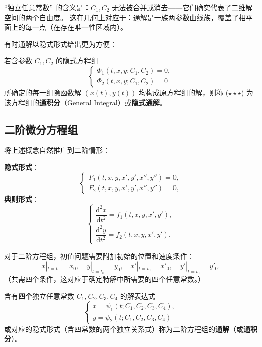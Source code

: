 \documentclass[lang=cn,11pt]{elegantbook}
\begin{document}
\begin{remark}[通解的独立性]
``独立任意常数'' 的含义是：$C_1,C_2$ 无法被合并或消去——它们确实代表了二维解空间的两个自由度。
这在几何上对应于：通解是一族两参数曲线族，覆盖了相平面上的每一点（在存在唯一性区域内）。
\end{remark}

有时通解以隐式形式给出更为方便：

\begin{definition}[一阶方程组的通积分] \label{def:first-integral-sys}
若含参数 $C_1,C_2$ 的隐式方程组
\[
\begin{cases}
\Phi_1(t,x,y;C_1,C_2)=0,\\
\Phi_2(t,x,y;C_1,C_2)=0
\end{cases}
\tag{$\star\star\star$}
\]
所确定的每一组隐函数解 $(x(t),y(t))$ 均构成原方程组的解，则称 ($\star\star\star$) 为该方程组的\textbf{通积分}（General Integral）或\textbf{隐式通解}。
\end{definition}


\subsection{二阶微分方程组}

将上述概念自然推广到二阶情形：

\begin{definition}[二阶微分方程组的一般形式]
\textbf{隐式形式}：
\[
\begin{cases}
F_1\!\left(t,x,y,x',y',x'',y''\right)=0,\\
F_2\!\left(t,x,y,x',y',x'',y''\right)=0,
\end{cases}
\]
\textbf{典则形式}：
\[
\begin{cases}
\dfrac{\mathrm{d}^{2}x}{\mathrm{d}t^{2}}=f_1\!\left(t,x,y,x',y'\right),\\[6pt]
\dfrac{\mathrm{d}^{2}y}{\mathrm{d}t^{2}}=f_2\!\left(t,x,y,x',y'\right).
\end{cases}\]
\end{definition}

\begin{definition}[二阶方程组的初值问题] \label{def:ivp-sys-2nd}
对于二阶方程组，初值问题需要附加初始的位置和速度条件：
\[
x|_{t=t_0}=x_0,\quad y|_{t=t_0}=y_0,\quad
x'|_{t=t_0}=x'_0,\quad y'|_{t=t_0}=y'_0.
\]
（共需四个条件，这对应于确定特解中所需要的四个任意常数。）
\end{definition}

\begin{definition}[二阶方程组的通解与通积分]
含有\textbf{四个}独立任意常数 $C_1,C_2,C_3,C_4$ 的解表达式
\[
\begin{cases}
x=\psi_1(t;C_1,C_2,C_3,C_4),\\
y=\psi_2(t;C_1,C_2,C_3,C_4)
\end{cases}
\]
或对应的隐式形式（含四常数的两个独立关系式）称为二阶方程组的\textbf{通解}（或\textbf{通积分}）。
\end{definition}
\end{document}
